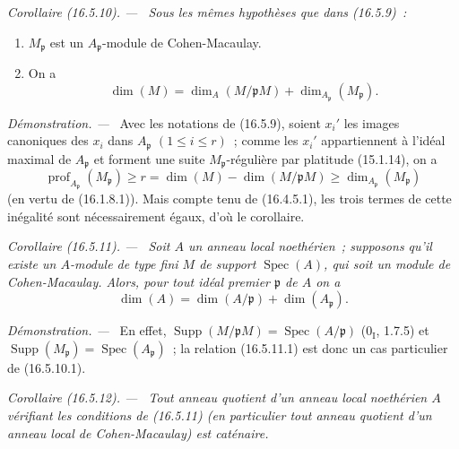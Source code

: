 \documentclass[10pt,oneside]{book}
\makeatletter
\newcommand{\setmanualcurrentlabel}[1]{\def\@currentlabel{#1}}
\newcommand{\oldpage}[2][]{%
  \setcounter{footnote}{0}%
  \marginpar{\scriptsize\textbf{#1}~|~#2}\ignorespaces}
\newenvironment{corollary}[1][]{%
  \setmanualcurrentlabel{#1}\par\medskip\noindent\itshape Corollaire (#1). ---\ }{\par}
\newenvironment{proof}{%
  \par\medskip\noindent\textit{Démonstration. ---\ }}{\par}
\makeatother
\begin{document}
\begin{corollary}[16.5.10]
\label{0.16.5.10-fr}
Sous les mêmes hypothèses que dans (16.5.9)~:
\begin{enumerate}
  \item[(i)] $M_{\mathfrak{p}}$ est un $A_{\mathfrak{p}}$-module de
  Cohen-Macaulay.
  \item[(ii)] On a
  \begin{equation}
  \label{0.16.5.10.1-fr}
  \tag{16.5.10.1}
    \dim(M)=\dim_A(M/\mathfrak{p}M)
    +\dim_{A_{\mathfrak{p}}}(M_{\mathfrak{p}}).
  \end{equation}
\end{enumerate}
\end{corollary}

\begin{proof}
Avec les notations de (16.5.9), soient $x_i'$ les images canoniques des $x_i$
dans $A_{\mathfrak{p}}$ $(1\leq i\leq r)$~; comme les $x_i'$ appartiennent à
l'idéal maximal de $A_{\mathfrak{p}}$ et forment une suite
$M_{\mathfrak{p}}$-régulière par platitude (15.1.14), on a
\[
  \operatorname{prof}_{A_{\mathfrak{p}}}(M_{\mathfrak{p}})
  \geq r=\dim(M)-\dim(M/\mathfrak{p}M)
  \geq\dim_{A_{\mathfrak{p}}}(M_{\mathfrak{p}})
\]
(en vertu de (16.1.8.1)). Mais compte tenu de (16.4.5.1), les trois termes de
cette inégalité sont nécessairement égaux, d'où le corollaire.
\end{proof}

\oldpage[0\textsubscript{IV-1}]{39}

\begin{corollary}[16.5.11]
\label{0.16.5.11-fr}
Soit $A$ un anneau local noethérien~; supposons qu'il existe un $A$-module de
type fini $M$ de support $\operatorname{Spec}(A)$, qui soit un module de
Cohen-Macaulay. Alors, pour tout idéal premier $\mathfrak{p}$ de $A$ on a
\begin{equation}
\label{0.16.5.11.1-fr}
\tag{16.5.11.1}
  \dim(A)=\dim(A/\mathfrak{p})+\dim(A_{\mathfrak{p}}).
\end{equation}
\end{corollary}

\begin{proof}
En effet, $\operatorname{Supp}(M/\mathfrak{p}M)
=\operatorname{Spec}(A/\mathfrak{p})$ ($0_{\mathrm I}$, 1.7.5) et
$\operatorname{Supp}(M_{\mathfrak{p}})
=\operatorname{Spec}(A_{\mathfrak{p}})$~; la relation (16.5.11.1) est donc un
cas particulier de (16.5.10.1).
\end{proof}

\begin{corollary}[16.5.12]
\label{0.16.5.12-fr}
Tout anneau quotient d'un anneau local noethérien $A$ vérifiant les conditions
de (16.5.11) (en particulier tout anneau quotient d'un anneau local de
Cohen-Macaulay) est \emph{caténaire}.
\end{corollary}
\end{document}
